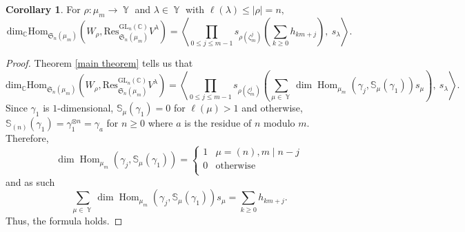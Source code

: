 \documentclass[12pt,reqno]{amsart}
\theoremstyle{definition}
\newtheorem{cor}[thm]{Corollary}
\DeclareMathOperator{\Par}{\mathbb{Y}}
\DeclareMathOperator{\Hom}{\mathrm{Hom}}
\begin{document}
\begin{cor}\label{cyclic cor}
For $\rho: \mu_m \rightarrow \Par$ and $\lambda \in \Par$ with $\ell(\lambda) \leq |\rho| = n,$
    $$\mathrm{dim}_{\mathbb{C}} \mathrm{Hom}_{\mathfrak{S}_{n}(\mu_m)}\left( W_{\rho}, \mathrm{Res}^{\mathrm{GL}_n(\mathbb{C})}_{\mathfrak{S}_n(\mu_m)} V^{\lambda} \right) = \left\langle \prod_{0\leq j \leq m-1} s_{\rho(\zeta_m^j)}\left( \sum_{k \geq 0} h_{km+j}\right), ~ s_{\lambda} \right\rangle.$$
\end{cor}
\begin{proof}
    Theorem \ref{main theorem} tells us that 
    $$\mathrm{dim}_{\mathbb{C}} \mathrm{Hom}_{\mathfrak{S}_{n}(\mu_m)}\left( W_{\rho}, \mathrm{Res}^{\mathrm{GL}_n(\mathbb{C})}_{\mathfrak{S}_n(\mu_m)} V^{\lambda} \right) = \left\langle \prod_{0 \leq j \leq m-1} s_{\rho(\zeta_m^j)}\left(\sum_{\mu \in \Par} \dim \Hom_{\mu_m}(\gamma_j, \mathbb{S}_{\mu}(\gamma_1)) s_{\mu}\right), ~ s_{\lambda} \right\rangle.$$ Since $\gamma_1$ is $1$-dimensional, $\mathbb{S}_{\mu}(\gamma_1) = 0$ for $\ell(\mu) > 1$ and otherwise, $\mathbb{S}_{(n)}(\gamma_1) = \gamma_1^{\otimes n} = \gamma_a$ for $n \geq 0$ where $a$ is the residue of $n$ modulo $m.$ Therefore, $$\dim \Hom_{\mu_m}(\gamma_j, \mathbb{S}_{\mu}(\gamma_1)) = \begin{cases}
        1 & \mu = (n), m \mid n-j\\
        0 & \text{otherwise}\\
    \end{cases}$$ and as such 
    $$\sum_{\mu \in \Par} \dim \Hom_{\mu_m}(\gamma_j, \mathbb{S}_{\mu}(\gamma_1)) s_{\mu} = \sum_{k \geq 0} h_{km+j}.$$ Thus, the formula holds.
\end{proof}











\printbibliography
\end{document}
